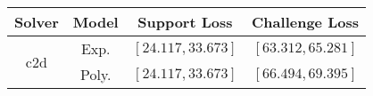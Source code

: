 \begin{tabular}{cc|c|c} 
\hline 
 Solver & Model & Support Loss  & Challenge Loss \tabularnewline\hline 
\hline 
\multirow{2}{*}{c2d} & Exp. & $\mathbf{\left[24.117,33.673\right]}$ & $\mathbf{\left[63.312,65.281\right]}$ \tabularnewline 
 & Poly. & $\left[24.117,33.673\right]$ & $\left[66.494,69.395\right]$ \tabularnewline 
\hline 
\end{tabular} 

